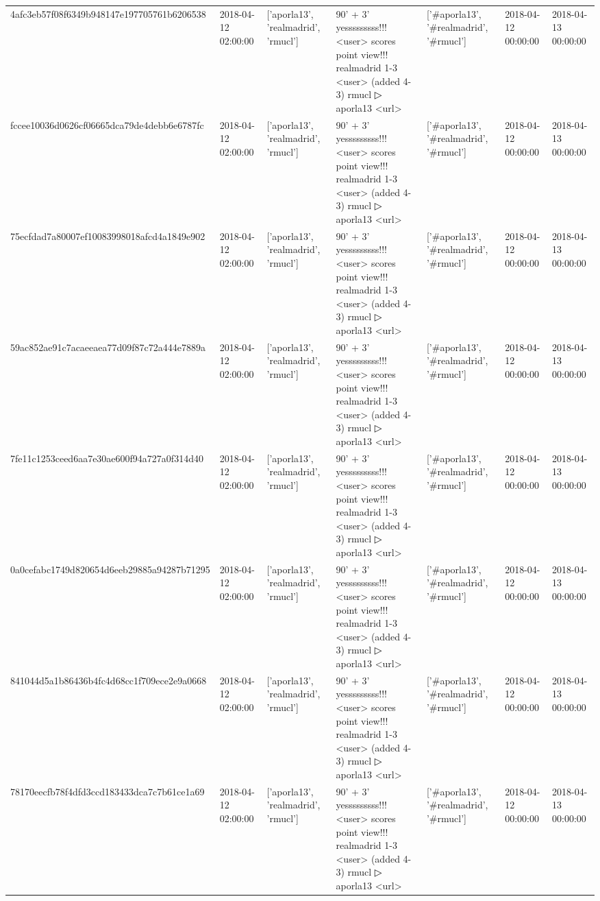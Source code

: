 \begin{tabular}{lllllll}
4afc3eb57f08f6349b948147e197705761b6206538 & 2018-04-12 02:00:00 & ['aporla13', 'realmadrid', 'rmucl'] & 90' + 3' yesssssssss!!! <user> scores point view!!! realmadrid 1-3 <user> (added 4-3) rmucl ▷ aporla13 <url> & ['#aporla13', '#realmadrid', '#rmucl'] & 2018-04-12 00:00:00 & 2018-04-13 00:00:00 \\
fccee10036d0626cf06665dca79de4debb6e6787fc & 2018-04-12 02:00:00 & ['aporla13', 'realmadrid', 'rmucl'] & 90' + 3' yesssssssss!!! <user> scores point view!!! realmadrid 1-3 <user> (added 4-3) rmucl ▷ aporla13 <url> & ['#aporla13', '#realmadrid', '#rmucl'] & 2018-04-12 00:00:00 & 2018-04-13 00:00:00 \\
75ecfdad7a80007ef10083998018afcd4a1849e902 & 2018-04-12 02:00:00 & ['aporla13', 'realmadrid', 'rmucl'] & 90' + 3' yesssssssss!!! <user> scores point view!!! realmadrid 1-3 <user> (added 4-3) rmucl ▷ aporla13 <url> & ['#aporla13', '#realmadrid', '#rmucl'] & 2018-04-12 00:00:00 & 2018-04-13 00:00:00 \\
59ac852ae91c7acaeeaea77d09f87c72a444e7889a & 2018-04-12 02:00:00 & ['aporla13', 'realmadrid', 'rmucl'] & 90' + 3' yesssssssss!!! <user> scores point view!!! realmadrid 1-3 <user> (added 4-3) rmucl ▷ aporla13 <url> & ['#aporla13', '#realmadrid', '#rmucl'] & 2018-04-12 00:00:00 & 2018-04-13 00:00:00 \\
7fe11c1253ceed6aa7e30ae600f94a727a0f314d40 & 2018-04-12 02:00:00 & ['aporla13', 'realmadrid', 'rmucl'] & 90' + 3' yesssssssss!!! <user> scores point view!!! realmadrid 1-3 <user> (added 4-3) rmucl ▷ aporla13 <url> & ['#aporla13', '#realmadrid', '#rmucl'] & 2018-04-12 00:00:00 & 2018-04-13 00:00:00 \\
0a0cefabc1749d820654d6eeb29885a94287b71295 & 2018-04-12 02:00:00 & ['aporla13', 'realmadrid', 'rmucl'] & 90' + 3' yesssssssss!!! <user> scores point view!!! realmadrid 1-3 <user> (added 4-3) rmucl ▷ aporla13 <url> & ['#aporla13', '#realmadrid', '#rmucl'] & 2018-04-12 00:00:00 & 2018-04-13 00:00:00 \\
841044d5a1b86436b4fc4d68cc1f709ece2e9a0668 & 2018-04-12 02:00:00 & ['aporla13', 'realmadrid', 'rmucl'] & 90' + 3' yesssssssss!!! <user> scores point view!!! realmadrid 1-3 <user> (added 4-3) rmucl ▷ aporla13 <url> & ['#aporla13', '#realmadrid', '#rmucl'] & 2018-04-12 00:00:00 & 2018-04-13 00:00:00 \\
78170eecfb78f4dfd3ccd183433dca7c7b61ce1a69 & 2018-04-12 02:00:00 & ['aporla13', 'realmadrid', 'rmucl'] & 90' + 3' yesssssssss!!! <user> scores point view!!! realmadrid 1-3 <user> (added 4-3) rmucl ▷ aporla13 <url> & ['#aporla13', '#realmadrid', '#rmucl'] & 2018-04-12 00:00:00 & 2018-04-13 00:00:00 \\

\end{tabular}
